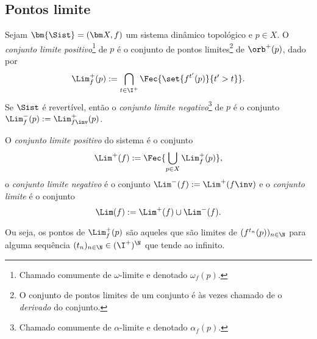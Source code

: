 \subsection{Pontos limite}

\begin{definition}
Sejam $\bm{\Sist}=(\bm X,f)$ um sistema dinâmico topológico e $p \in X$. O \emph{conjunto limite positivo}\footnote{Chamado comumente de $\omega$-limite e denotado $\omega_f(p)$.} de $p$ é o conjunto de pontos limites\footnote{O conjunto de pontos limites de um conjunto é às vezes chamado de o \emph{derivado} do conjunto.} de $\orb^+(p)$, dado por
	\begin{equation*}
	\Lim^+_f(p) := \bigcap_{t \in \I^+}\Fec{\set{f^{t'}(p)}{t'>t}}.
	\end{equation*}
Se $\Sist$ é revertível, então o \emph{conjunto limite negativo}\footnote{Chamado comumente de $\alpha$-limite e denotado $\alpha_f(p)$.} de $p$ é o conjunto $\Lim^-_f(p) := \Lim^+_{f\inv}(p)$.

O \emph{conjunto limite positivo} do sistema é o conjunto
	\begin{equation*}
	\Lim^+(f) := \Fec{\bigcup_{p \in X} \Lim^+_f(p)},
	\end{equation*}
o \emph{conjunto limite negativo} é o conjunto $\Lim^-(f) := \Lim^+(f\inv)$
e o \emph{conjunto limite} é o conjunto
	\begin{equation*}
	\Lim(f) := \Lim^+(f) \cup \Lim^-(f).
	\end{equation*}
\end{definition}

Ou seja, os pontos de $\Lim^+_f(p)$ são aqueles que são limites de $(f^{t_n}(p))_{n \in \N}$ para alguma sequência $(t_n)_{n \in \N} \in (\I^+)^\N$ que tende ao infinito.


